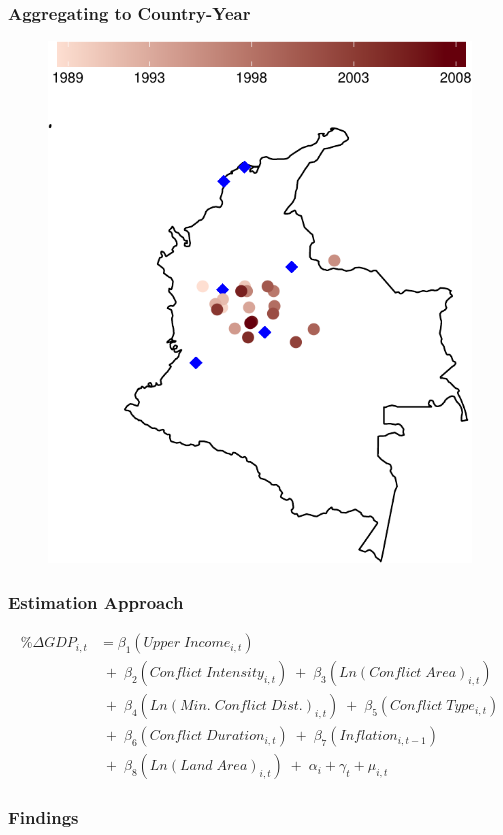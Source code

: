 \begin{frame}
\frametitle{Aggregating to Country-Year}

\begin{figure}[ht]
	\centering
	\includegraphics[width=.6\textwidth]{colombiaMap-crop}
\end{figure}

\end{frame}

\begin{frame}
\frametitle{Estimation Approach}

\begin{align*}
	\% \Delta GDP_{i,t} &= \beta_{1}(Upper \; Income_{i,t}) \\
	& \;+\; \beta_{2}(Conflict \; Intensity_{i,t}) \;+\; \beta_{3}(Ln(Conflict \; Area)_{i,t}) \\
	& \;+\; \beta_{4}(Ln(Min. \; Conflict \; Dist.)_{i,t}) \;+\; \beta_{5}(Conflict \; Type_{i,t}) \\
	& \;+\; \beta_{6}(Conflict \; Duration_{i,t}) \;+\; \beta_{7}(Inflation_{i,t-1}) \\
	& \;+\; \beta_{8}(Ln(Land \; Area)_{i,t}) \;+\; \alpha_{i} + \gamma_{t} + \mu_{i,t}
\end{align*}

\end{frame}

\begin{frame}
\frametitle{Findings}

\begin{figure}[ht]
	\centering
	\resizebox{.8\textwidth}{!}{}
\end{figure}

\end{frame}

